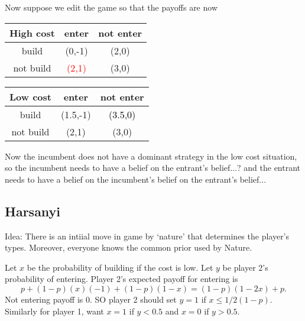 Now suppose we edit the game so that the payoffs are now 
\begin{center}
    \begin{tabular}{|c|c c|}
        \hline High cost & enter & not enter \\
        \hline 
        build & (0,-1) & (2,0)\\
        \hline
        not build & \textcolor{red}{(2,1)} & (3,0)\\\hline
    \end{tabular} 
    \linebreak[3pt]
    
    \begin{tabular}{|c|c c|}
        \hline Low cost & enter & not enter \\
        \hline 
        build & (1.5,-1) & \textcolor{black}{(3.5,0)}\\
        \hline
        not build & (2,1) & (3,0)\\\hline
    \end{tabular}
\end{center}

Now the incumbent does not have a dominant strategy in the low cost situation, so the incumbent needs to have a belief on the entrant's belief...? and the entrant needs to have a belief on the incumbent's belief on the entrant's belief... 

\subsection*{Harsanyi}

Idea: There is an intiial move in game by `nature' that determines the player's types. Moreover, everyone knows the common prior used by Nature. 
\begin{center}
    \end{center}

Let $x$ be the probability of building if the cost is low. Let $y$ be player 2's probability of entering.
Player 2's expected payoff for entering is \[
p +(1-p)(x)(-1)+ (1-p)(1-x) = (1-p)(1-2x)+p.
\]
Not entering payoff is $0$.
SO player 2 should set $y=1$ if $x\leq 1/2(1-p)$.
Similarly for player 1, want $x=1$ if $y<0.5$ and $x=0$ if $y>0.5$.

